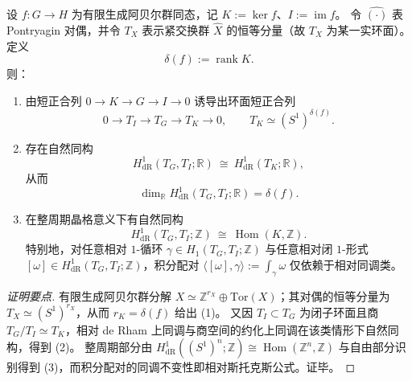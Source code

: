 \begin{theorem}\label{thm:conclusion-relative-stokes-torus-defect}
设 \(f:G\to H\) 为有限生成阿贝尔群同态，记 \(K:=\ker f\)、\(I:=\operatorname{im}f\)。
令 \(\widehat{(\cdot)}\) 表 Pontryagin 对偶，并令 \(T_X\) 表示紧交换群 \(\widehat X\) 的恒等分量（故 \(T_X\) 为某一实环面）。
定义
\[
\delta(f):=\operatorname{rank}K.
\]
则：
\begin{enumerate}
  \item 由短正合列 \(0\to K\to G\to I\to 0\) 诱导出环面短正合列
  \[
  0\longrightarrow T_I\longrightarrow T_G\longrightarrow T_K\longrightarrow 0,
  \qquad
  T_K\simeq (S^1)^{\delta(f)}.
  \]
  \item 存在自然同构
  \[
  H^1_{\mathrm{dR}}(T_G,T_I;\mathbb R)\ \cong\ H^1_{\mathrm{dR}}(T_K;\mathbb R),
  \]
  从而
  \[
  \dim_{\mathbb R}H^1_{\mathrm{dR}}(T_G,T_I;\mathbb R)=\delta(f).
  \]
  \item 在整周期晶格意义下有自然同构
  \[
  H^1_{\mathrm{dR}}(T_G,T_I;\mathbb Z)\ \cong\ \operatorname{Hom}(K,\mathbb Z).
  \]
  特别地，对任意相对 \(1\)-循环 \(\gamma\in H_1(T_G,T_I;\mathbb Z)\) 与任意相对闭 \(1\)-形式
  \([\omega]\in H^1_{\mathrm{dR}}(T_G,T_I;\mathbb Z)\)，积分配对
  \(
  \langle[\omega],\gamma\rangle:=\int_\gamma\omega
  \)
  仅依赖于相对同调类。
\end{enumerate}
\end{theorem}
\begin{proof}[证明要点]
有限生成阿贝尔群分解 \(X\simeq \mathbb Z^{r_X}\oplus \mathrm{Tor}(X)\)；其对偶的恒等分量为 \(T_X\simeq (S^1)^{r_X}\)，从而 \(r_K=\delta(f)\) 给出 (1)。
又因 \(T_I\subset T_G\) 为闭子环面且商 \(T_G/T_I\simeq T_K\)，相对 de Rham 上同调与商空间的约化上同调在该类情形下自然同构，得到 (2)。
整周期部分由
\(
H^1_{\mathrm{dR}}((S^1)^n;\mathbb Z)\cong \operatorname{Hom}(\mathbb Z^n,\mathbb Z)
\)
与自由部分识别得到 (3)，而积分配对的同调不变性即相对斯托克斯公式。证毕。
\end{proof}

